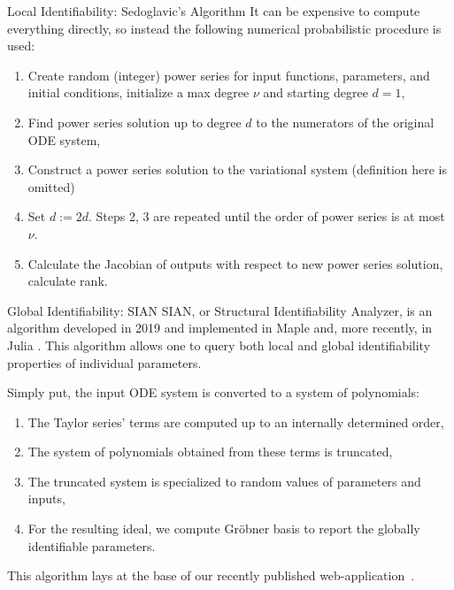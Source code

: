 \documentclass[final]{beamer}
\newlength{\colwidth}
\begin{document}
\begin{frame}[t]
\begin{columns}[t]
\begin{column}{\colwidth}
\begin{block}{Local Identifiability: Sedoglavic's Algorithm \cite{sedoglavic2002probabilistic}}
        It can be expensive to compute everything directly, so instead the following numerical probabilistic procedure is used:
        \begin{enumerate}
          \item Create random (integer) power series for input functions, parameters, and initial conditions, initialize a max degree \(\nu\) and starting degree \(d=1\),
          \item Find power series solution up to degree \(d\) to the numerators of the original ODE system,
          \item Construct a power series solution to the variational system (definition here is omitted)
          \item Set \(d:=2d\). Steps 2, 3 are repeated until the order of power series is at most \(\nu\).
          \item Calculate the Jacobian of outputs with respect to new power series solution, calculate rank.
        \end{enumerate}

      \end{block}

      \begin{block}{Global Identifiability: SIAN \cite{hong2019sian}}
        SIAN, or Structural Identifiability Analyzer, is an algorithm developed in 2019 and implemented in {\sc Maple} \cite{sian_github} and, more recently, in Julia \cite{sian_julia_github}. This algorithm allows one to query both local and global identifiability properties of individual parameters.

        Simply put, the input ODE system is converted to a system of polynomials:
        \begin{enumerate}
          \item The Taylor series' terms are computed up to an internally determined order,
          \item The system of polynomials obtained from these terms is truncated,
          \item The truncated system is specialized to random values of parameters and inputs,
          \item For the resulting ideal, we compute Gr\"obner basis to report the globally identifiable parameters.
        \end{enumerate}
        This algorithm lays at the base of our recently published web-application~\cite{ilmer2021web}.
      \end{block}


\end{column}
\end{columns}
\end{frame}
\end{document}
